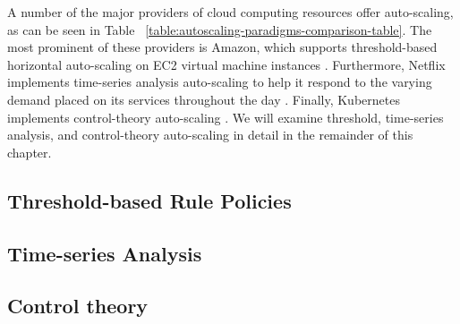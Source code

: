 A number of the major providers of cloud computing resources offer auto-scaling,
as can be seen in Table ~\ref{table:autoscaling-paradigms-comparison-table}.
The most prominent of these providers is Amazon, which supports threshold-based
horizontal auto-scaling on EC2 virtual machine
instances \cite{amazon-auto-scaling-developer-guide}. Furthermore, Netflix
implements time-series analysis auto-scaling to help it respond to the
varying demand placed on its services throughout the
day \cite{netflix-scryer-part-i}. Finally, Kubernetes
implements control-theory auto-scaling
\cite{k8s-horizontal-pod-autoscaler-proposal}.
We will examine threshold, time-series analysis, and control-theory
auto-scaling in detail in the remainder of this chapter.



\subsection{Threshold-based Rule Policies}



\subsection{Time-series Analysis}



\subsection{Control theory}


